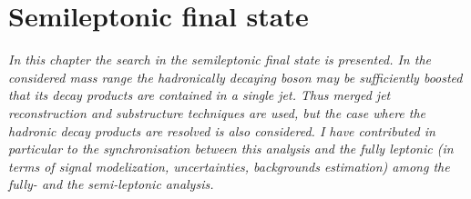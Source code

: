 \chapter{Semileptonic final state}
\label{cap6}

\textit{In this chapter the search in the semileptonic final state is
  presented. In the considered mass range the hadronically decaying
  boson may be sufficiently boosted that its decay products are
  contained in a single jet. Thus merged jet
reconstruction and substructure techniques are used, but the case where the hadronic
decay products are resolved is also considered. I have contributed in
particular to 
the synchronisation between this analysis and the fully leptonic (in terms of signal modelization, uncertainties, 
backgrounds estimation) among the fully- and the semi-leptonic analysis. }

